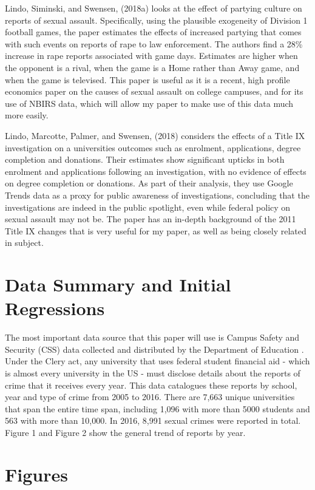 \documentclass[AER]{AEA}
\begin{document}
Lindo, Siminski, and Swensen, (2018a) looks at the effect of partying culture on reports of sexual assault. Specifically, using the plausible exogeneity of Division 1 football games, the paper estimates the effects of increased partying that comes with such events on reports of rape to law enforcement. The authors find a 28\% increase in rape reports associated with game days. Estimates are higher when the opponent is a rival, when the game is a Home rather than Away game, and when the game is televised. This paper is useful as it is a recent, high profile economics paper on the causes of sexual assault on college campuses, and for its use of NBIRS data, which will allow my paper to make use of this data much more easily.

Lindo, Marcotte, Palmer, and Swensen, (2018) considers the effects of a Title IX investigation on a universities outcomes such as enrolment, applications, degree completion and donations. Their estimates show significant upticks in both enrolment and applications following an investigation, with no evidence of effects on degree completion or donations. As part of their analysis, they use Google Trends data as a proxy for public awareness of investigations, concluding that the investigations are indeed in the public spotlight, even while federal policy on sexual assault may not be. The paper has an in-depth background of the 2011 Title IX changes that is very useful for my paper, as well as being closely related in subject. 

\section{Data Summary and Initial Regressions}

The most important data source that this paper will use is Campus Safety and Security (CSS) data collected and distributed by the Department of Education . Under the Clery act, any university that uses federal student financial aid - which is almost every university in the US - must disclose details about the reports of crime that it receives every year. This data catalogues these reports by school, year and type of crime from 2005 to 2016. There are 7,663 unique universities that span the entire time span, including 1,096 with more than 5000 students and 563 with more than 10,000. In 2016, 8,991 sexual crimes were reported in total. Figure 1 and Figure 2 show the general trend of reports by year.  

\section{Figures}
\end{document}
